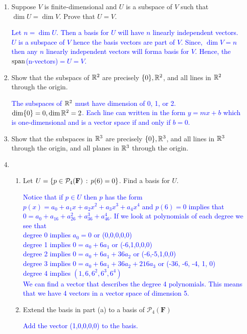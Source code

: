 \documentclass[10pt,a4paper]{report}
\newcommand{\BLUE}[1]{\textcolor{blue}{#1}}
\newcommand{\F}{\textbf{F}}
\begin{document}
\begin{enumerate}

\item Suppose $V$ is finite-dimensional and $U$ is a subspace of $V$ such that $\dim U=\dim V$.  Prove that $U=V$.

\BLUE{Let $n=\dim U$.  Then a basis for $U$ will have $n$ linearly independent vectors.  $U$ is a subspace of $V$ hence the basis vectors are part of $V$.  Since, $\dim V=n$ then any $n$ linearly independent vectors will forma  basis for $V$.  Hence, the $\operatorname{span}$(n-vectors)$=U=V$.
}

\item Show that the subspacs of $\mathbb{R}^2$ are precisely $\{0\}, \mathbb{R}^2$, and all lines in $\mathbb{R}^2$ through the origin.

\BLUE{The subspaces of $\mathbb{R}^2$ must have dimension of 0, 1, or 2.  $\dim \{0\} =0, \dim \mathbb{R}^2=2$.  Each line can written in the form $y=mx+b$ which is one-dimensional and is a vector space if and only if $b=0$.
}

\item Show that the subspaces in $\mathbb{R}^3$ are precisely $\{0\}, \mathbb{R}^3$, and all lines in $\mathbb{R}^3$ through the origin, and all planes in $\mathbb{R}^3$ through the origin.

\item \begin{enumerate}
	\item Let $U=\{p \in \PP{4}\,:\, p(6)=0\}$.  Find a basis for $U$.
	
	\BLUE{Notice that if $p \in U$ then $p$ has the form $p(x)=a_0+a_1x+a_2x^2+a_3x^3+a_4x^4$ and $p(6)=0$ implies that $0 = a_0+a_16+a_26^2+a_36^3+a_46^4$.  If we look at polynomials of each degree we see that \\
	degree 0 implies $a_0 =0$ or (0,0,0,0,0)\\
	degree 1 implies $0=a_0 + 6a_1$ or (-6,1,0,0,0)\\
	degree 2 implies $0=a_0+6a_1+36a_2$ or (-6,-5,1,0,0) \\
	degree 3 implies $0=a_0+6a_1+36a_2+216a_3$ or (-36, -6, -4, 1, 0)\\
	degree 4 implies $(1,6,6^2,6^3,6^4)$ \\
	We can find a vector that describes the degree 4 polynomials.  This means that we have 4 vectors in a vector space of dimension 5.
	}
	
	\item Extend the basis in part (a) to a basis of $\mathcal{P}_4(\F)$
	
	\BLUE{
		Add the vector (1,0,0,0,0) to the basis.	
	}
	

\end{enumerate}
\end{enumerate}
\end{document}
